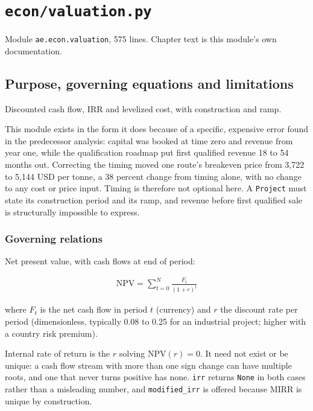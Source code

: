 \documentclass[10pt,a4paper,twoside]{report}
\begin{document}
\clearpage

\chapter{\texttt{econ/valuation.py}}\label{ch:valuation}


{\footnotesize\color{slate}Module \texttt{ae.econ.valuation}, 575 lines. Chapter text is this module's own documentation.\par}

\section{Purpose, governing equations and limitations}

Discounted cash flow, IRR and levelized cost, with construction and ramp.

This module exists in the form it does because of a specific, expensive error found in the predecessor analysis: capital was booked at time zero and revenue from year one, while the qualification roadmap put first qualified revenue 18 to 54 months out. Correcting the timing moved one route's breakeven price from 3,722 to 5,144 USD per tonne, a 38 percent change from timing alone, with no change to any cost or price input. Timing is therefore not optional here. A \texttt{Project} must state its construction period and its ramp, and revenue before first qualified sale is structurally impossible to express.

\subsection*{Governing relations}

Net present value, with cash flows at end of period:

\begin{equation*}
\begin{gathered}
\mathrm{NPV} = \sum_{t=0}^{N} \frac{F_t}{(1+r)^{t}}
\end{gathered}
\end{equation*}

where $F_t$ is the net cash flow in period $t$ (currency) and $r$ the discount rate per period (dimensionless, typically 0.08 to 0.25 for an industrial project; higher with a country risk premium).

Internal rate of return is the $r$ solving $\mathrm{NPV}(r) = 0$. It need not exist or be unique: a cash flow stream with more than one sign change can have multiple roots, and one that never turns positive has none. \texttt{irr} returns \texttt{None} in both cases rather than a misleading number, and \texttt{modified\_irr} is offered because MIRR is unique by construction.
\end{document}
